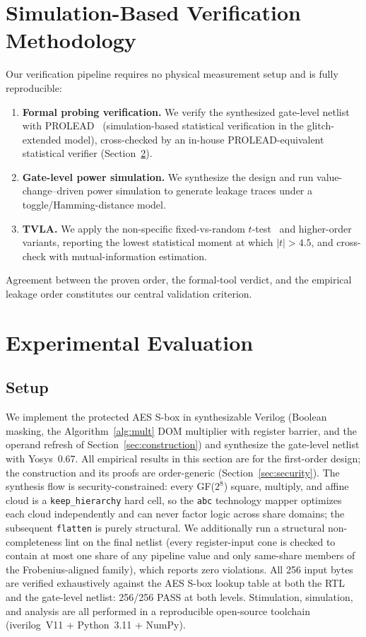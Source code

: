 \documentclass[lettersize,journal]{IEEEtran}
\begin{document}
\section{Simulation-Based Verification Methodology}
\label{sec:method}
Our verification pipeline requires no physical measurement setup and is fully
reproducible:
\begin{enumerate}
  \item \textbf{Formal probing verification.} We verify the synthesized
        gate-level netlist with PROLEAD~\cite{muller2022prolead}
        (simulation-based statistical verification in the glitch-extended
        model), cross-checked by an in-house PROLEAD-equivalent
        statistical verifier (Section~\ref{sec:eval}).
  \item \textbf{Gate-level power simulation.} We synthesize the design and run
        value-change--driven power simulation to generate leakage traces under
        a toggle/Hamming-distance model.
  \item \textbf{TVLA.} We apply the non-specific fixed-vs-random
        $t$-test~\cite{goodwill2011tvla} and higher-order variants, reporting
        the lowest statistical moment at which $|t|>4.5$, and cross-check with
        mutual-information estimation.
\end{enumerate}
Agreement between the proven order, the formal-tool verdict, and the empirical
leakage order constitutes our central validation criterion.

\section{Experimental Evaluation}
\label{sec:eval}
\subsection{Setup}
We implement the protected AES S-box in synthesizable
Verilog (Boolean masking, the Algorithm~\ref{alg:mult} DOM multiplier with
register barrier, and the operand refresh of
Section~\ref{sec:construction}) and synthesize the gate-level netlist with
Yosys~0.67.  All empirical results in this section are for the
first-order design; the construction and its proofs are
order-generic (Section~\ref{sec:security}).  The synthesis flow is security-constrained: every GF($2^8$)
square, multiply, and affine cloud is a \texttt{keep\_hierarchy} hard cell,
so the \texttt{abc} technology mapper optimizes each cloud independently
and can never factor logic across share domains; the subsequent
\texttt{flatten} is purely structural.  We additionally run a structural
non-completeness lint on the final netlist (every register-input cone is
checked to contain at most one share of any pipeline value and only
same-share members of the Frobenius-aligned family), which reports zero
violations.  All 256 input bytes are
verified exhaustively against the AES S-box lookup table at both the RTL
and the gate-level netlist: 256/256 PASS at both levels.  Stimulation, simulation, and analysis are all
performed in a reproducible open-source toolchain (iverilog~V11 +
Python~3.11 + NumPy).
\end{document}
